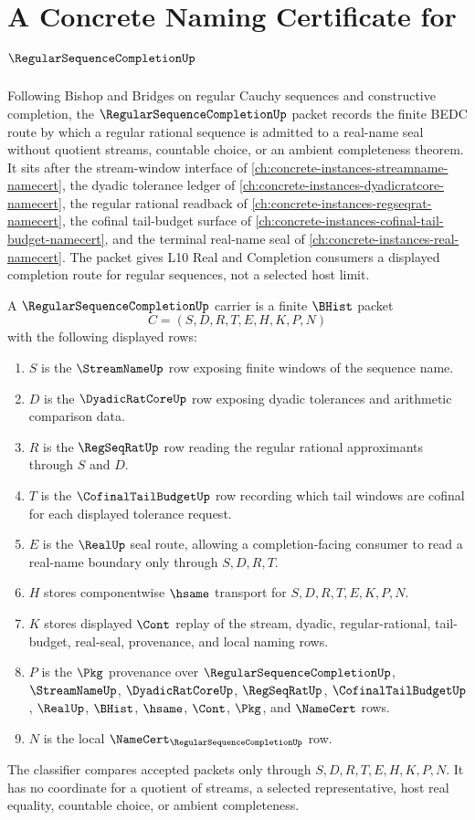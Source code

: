 \chapter{A Concrete Naming Certificate for $\RegularSequenceCompletionUp$}
\label{ch:concrete-instances-regular-sequence-completion-namecert}

Following Bishop and Bridges on regular Cauchy sequences and constructive completion, the $\RegularSequenceCompletionUp$ packet records the finite BEDC route by which a regular rational sequence is admitted to a real-name seal without quotient streams, countable choice, or an ambient completeness theorem. It sits after the stream-window interface of \autoref{ch:concrete-instances-streamname-namecert}, the dyadic tolerance ledger of \autoref{ch:concrete-instances-dyadicratcore-namecert}, the regular rational readback of \autoref{ch:concrete-instances-regseqrat-namecert}, the cofinal tail-budget surface of \autoref{ch:concrete-instances-cofinal-tail-budget-namecert}, and the terminal real-name seal of \autoref{ch:concrete-instances-real-namecert}. The packet gives L10 Real and Completion consumers a displayed completion route for regular sequences, not a selected host limit.

\begin{definition}
\label{def:regular-sequence-completion-carrier}
A $\RegularSequenceCompletionUp$ carrier is a finite $\BHist$ packet
$$
C=(S,D,R,T,E,H,K,P,N)
$$
with the following displayed rows:
\begin{enumerate}
\item $S$ is the $\StreamNameUp$ row exposing finite windows of the sequence name.
\item $D$ is the $\DyadicRatCoreUp$ row exposing dyadic tolerances and arithmetic comparison data.
\item $R$ is the $\RegSeqRatUp$ row reading the regular rational approximants through $S$ and $D$.
\item $T$ is the $\CofinalTailBudgetUp$ row recording which tail windows are cofinal for each displayed tolerance request.
\item $E$ is the $\RealUp$ seal route, allowing a completion-facing consumer to read a real-name boundary only through $S,D,R,T$.
\item $H$ stores componentwise $\hsame$ transport for $S,D,R,T,E,K,P,N$.
\item $K$ stores displayed $\Cont$ replay of the stream, dyadic, regular-rational, tail-budget, real-seal, provenance, and local naming rows.
\item $P$ is the $\Pkg$ provenance over $\RegularSequenceCompletionUp$, $\StreamNameUp$, $\DyadicRatCoreUp$, $\RegSeqRatUp$, $\CofinalTailBudgetUp$, $\RealUp$, $\BHist$, $\hsame$, $\Cont$, $\Pkg$, and $\NameCert$ rows.
\item $N$ is the local $\NameCert_{\RegularSequenceCompletionUp}$ row.
\end{enumerate}
The classifier compares accepted packets only through $S,D,R,T,E,H,K,P,N$. It has no coordinate for a quotient of streams, a selected representative, host real equality, countable choice, or ambient completeness.
\end{definition}

